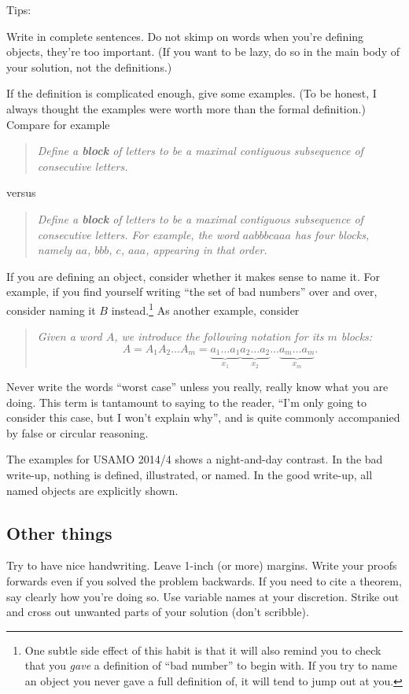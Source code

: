 \documentclass[11pt]{scrartcl}
\begin{document}
Tips:
\begin{itemize}
  \ii \alert{Write in complete sentences}.
  Do not skimp on words when you're defining objects, they're too important.
  (If you want to be lazy, do so in the main body of your solution, not the definitions.)

  \ii If the definition is complicated enough, \alert{give some examples}.
  (To be honest, I always thought the examples were worth more than the formal definition.)
  Compare for example
  \begin{quote}
  \slshape
  Define a \textbf{block} of letters to be a maximal
  contiguous subsequence of consecutive letters.
  \end{quote}
  versus
  \begin{quote}
  \slshape
  Define a \textbf{block} of letters to be a maximal
  contiguous subsequence of consecutive letters.
  For example, the word $aabbbcaaa$ has four blocks,
  namely $aa$, $bbb$, $c$, $aaa$, appearing in that order.
  \end{quote}

  \ii If you are defining an object,
  \alert{consider whether it makes sense to name it}.
  For example, if you find yourself writing ``the set of bad numbers'' over and over,
  consider naming it $B$ instead.\footnote{One subtle
    side effect of this habit is that it will also remind you to check
    that you \emph{gave} a definition of ``bad number'' to begin with.
    If you try to name an object you never gave a full definition of,
    it will tend to jump out at you.}
  As another example, consider
  \begin{quote}
  \slshape
  Given a word $A$, we introduce the following notation for its $m$ blocks:
  \[ A =
    A_1 A_2 \dots A_m
    = \underbrace{a_1 \dots a_1}_{x_1}
    \underbrace{a_2 \dots a_2}_{x_2}
    \dots
    \underbrace{a_m \dots a_m}_{x_m}.
  \]
  \end{quote}

  \ii \alert{Never write the words ``worst case''} unless you really,
  really know what you are doing.
  This term is tantamount to saying to the reader,
  ``I'm only going to consider this case, but I won't explain why'',
  and is quite commonly accompanied by false or circular reasoning.
\end{itemize}
The examples for USAMO 2014/4 shows a night-and-day contrast.
In the bad write-up, nothing is defined, illustrated, or named.
In the good write-up, all named objects are explicitly shown.

\subsection{Other things}
Try to have nice handwriting.
Leave 1-inch (or more) margins.
Write your proofs forwards even if you solved the problem backwards.
If you need to cite a theorem, say clearly how you're doing so.
Use variable names at your discretion.
Strike out and cross out unwanted parts of your solution (don't scribble).
\end{document}
